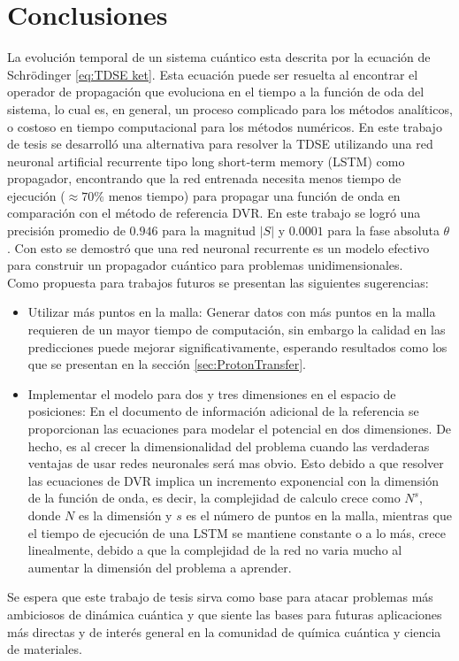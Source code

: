 \chapter{Conclusiones}\label{ch:Conclusiones}
La evolución temporal de un sistema cuántico esta descrita por la ecuación de Schrödinger \autoref{eq:TDSE ket}. Esta ecuación puede ser resuelta al encontrar el operador de propagación que evoluciona en el tiempo a la función de oda del sistema, lo cual es, en general, un proceso complicado para los métodos analíticos, o costoso en tiempo computacional para los métodos numéricos. En este trabajo de tesis se desarrolló una alternativa para resolver la \acs{TDSE} utilizando una red neuronal artificial recurrente tipo long short‐term memory (\acs{LSTM}) como propagador, encontrando que la red entrenada necesita menos tiempo de ejecución ($\approx 70\%$ menos tiempo) para propagar una función de onda en comparación con el método de referencia \acs{DVR}. En este trabajo se logró una precisión promedio de $0.946$ para la magnitud $|S|$ y $0.0001$ para la fase absoluta $\theta$. Con esto se demostró que una red neuronal recurrente es un modelo efectivo para construir un propagador cuántico para problemas unidimensionales.\\

Como propuesta para trabajos futuros se presentan las siguientes sugerencias:
\begin{itemize}[label=\textcolor{CTtitle}{\textbullet}]
\item Utilizar más puntos en la malla: Generar datos con más puntos en la malla requieren de un mayor tiempo de computación, sin embargo la calidad en las predicciones puede mejorar significativamente, esperando resultados como los que se presentan en la sección \autoref{sec:ProtonTransfer}. 
\item Implementar el modelo para dos y tres dimensiones en el espacio de posiciones: En el documento de información adicional de la referencia \cite{Main:2021} se proporcionan las ecuaciones para modelar el potencial en dos dimensiones. De hecho, es al crecer la dimensionalidad del problema cuando las verdaderas ventajas de usar redes neuronales será mas obvio. Esto debido a que resolver las ecuaciones de \acs{DVR} implica un incremento exponencial con la dimensión de la función de onda, es decir, la complejidad de calculo crece como $N^{s}$, donde $N$ es la dimensión y $s$ es el número de puntos en la malla, mientras que el tiempo de ejecución de una \acs{LSTM} se mantiene constante o a lo más, crece linealmente, debido a que la complejidad de la red no varia mucho al aumentar la dimensión del problema a aprender.
\end{itemize}
Se espera que este trabajo de tesis sirva como base para atacar problemas más ambiciosos de dinámica cuántica y que siente las bases para futuras aplicaciones más directas y de interés general en la comunidad de química cuántica y ciencia de materiales.